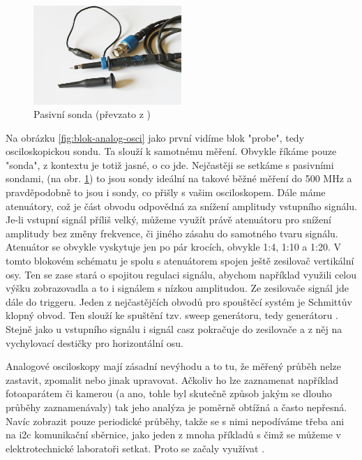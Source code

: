\documentclass[12pt]{article}
\begin{document}
\begin{figure}
    \centering
    \includegraphics[width=0.5\textwidth]{osci-pasive-probe}
    \caption{Pasivní sonda (převzato z \cite{DeutschStandardTastkopfFur2020})}
    \label{fig:osci-pasive-probe}
\end{figure}

Na obrázku \ref{fig:blok-analog-osci} jako první vidíme blok "probe", tedy osciloskopickou
sondu. Ta slouží k samotnému měření. Obvykle říkáme pouze "sonda", z kontextu je
totiž jasné, o co jde. Nejčastěji se setkáme s pasivními sondami,
(na obr. \ref{fig:osci-pasive-probe}) to jsou sondy ideální na takové běžné měření
do 500 MHz a pravděpodobně to jsou i sondy, co přišly s vašim osciloskopem.
Dále máme atenuátory, což je část obvodu odpovědná za snížení amplitudy vstupního signálu.
Je-li vstupní signál příliš velký, můžeme využít právě atenuátoru pro snížení
amplitudy bez změny frekvence, či jiného zásahu do samotného tvaru signálu.
Atenuátor se obvykle vyskytuje jen po pár krocích, obvykle 1:4, 1:10 a 1:20.
V tomto blokovém schématu je spolu s atenuátorem spojen ještě zesilovač vertikální osy.
Ten se zase stará o spojitou regulaci signálu, abychom například využili celou výšku
zobrazovadla a to i signálem s nízkou amplitudou. Ze zesilovače signál
jde dále do \gls{trigger}u. Jeden z nejčastějčích obvodů pro spouštěcí systém je Schmittův
klopný obvod. Ten slouží ke spuštění tzv. sweep generátoru, tedy generátoru .
Stejně jako u vstupního signálu i signál \acrshort{casz} pokračuje do zesilovače a z něj na
vychylovací destičky pro horizontální osu.

Analogové osciloskopy mají zásadní nevýhodu
a to tu, že měřený průběh nelze zastavit, zpomalit nebo jinak upravovat. Ačkoliv ho lze
zaznamenat například fotoaparátem či kamerou (a ano, tohle byl skutečně způsob jakým se
dlouho průběhy zaznamenávaly) tak jeho analýza je poměrně obtížná a často nepřesná.
Navíc zobrazit pouze periodické průběhy, takže se s nimi nepodíváme třeba ani na
\gls{i2c} komunikační sběrnice, jako jeden z mnoha příkladů s čimž se můžeme v elektrotechnické
laboratoři setkat. Proto se začaly využívat .
\end{document}
